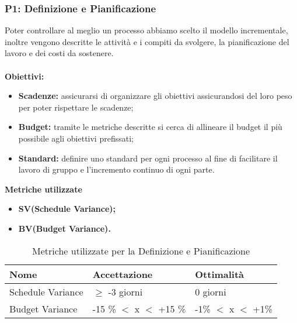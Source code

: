 \subsubsection{P1: Definizione e Pianificazione}
Poter controllare al meglio un processo abbiamo scelto il modello incrementale, inoltre vengono descritte le attività e i compiti da svolgere, la pianificazione del lavoro e dei costi da sostenere. \\\\
\textbf{Obiettivi:}
\begin{itemize}
		\item{\textbf{Scadenze:} assicurarsi di organizzare gli obiettivi assicurandosi del loro peso per poter rispettare le scadenze;}
		\item{\textbf{Budget:} tramite le metriche descritte si cerca di allineare il budget il più possibile agli obiettivi prefissati;}
		\item \textbf{Standard:} definire uno standard per ogni processo al fine di facilitare il lavoro di gruppo e l'incremento continuo di ogni parte.\\
\end{itemize} 
\textbf{Metriche utilizzate}
\begin{itemize}
	\item{\textbf{SV(Schedule Variance);}}
	\item{\textbf{BV(Budget Variance).}}
\end{itemize}
\begin{table}[!htpb]
	\centering
	\renewcommand{\arraystretch}{2} 
	\begin{tabular}{|l|l|l|}
		\hline
		\rowcolor{orange!50} 
		\textbf{Nome} & \textbf{Accettazione} & \textbf{Ottimalità} \\
		\hline
		Schedule Variance & $\geq$ -3 giorni &0 giorni \\
		\hline
		Budget Variance & -15 \% $<$ x $<$ +15 \% & -1\% $<$ x $<$ +1\% \\ 
		\hline
	\end{tabular}
	\caption{Metriche utilizzate per la Definizione e Pianificazione}
\end{table}
\newpage
